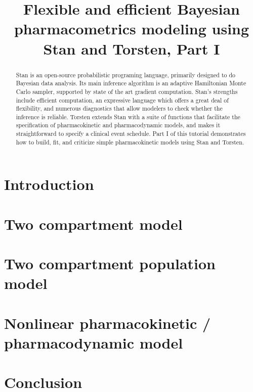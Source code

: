 \documentclass[11pt]{article}
\title{Flexible and efficient Bayesian pharmacometrics modeling using Stan and Torsten, Part I}
\author{}
\date{}
\begin{document}
\maketitle

\begin{abstract}
Stan is an open-source probabilistic programing language, primarily
designed to do Bayesian data analysis.  Its main inference algorithm
is an adaptive Hamiltonian Monte Carlo sampler, supported by state of
the art gradient computation.  Stan's strengths include efficient
computation, an expressive language which offers a great deal of
flexibility, and numerous diagnostics that allow modelers to check
whether the inference is reliable.  Torsten extends Stan with a suite
of functions that facilitate the specification of pharmacokinetic and
pharmacodynamic models, and makes it straightforward to specify a
clinical event schedule.  Part I of this tutorial demonstrates how to
build, fit, and criticize simple pharmacokinetic models using Stan and
Torsten.
\end{abstract} 

\section{Introduction}


%

\section{Two compartment model}  \label{sec:twoCpt}


\section{Two compartment population model}


\section{Nonlinear pharmacokinetic / pharmacodynamic model}


\section{Conclusion}




\end{document}
